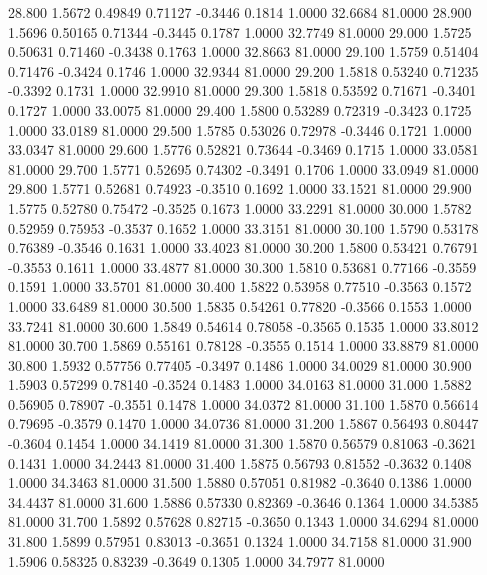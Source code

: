   28.800   1.5672   0.49849   0.71127  -0.3446   0.1814   1.0000  32.6684  81.0000
  28.900   1.5696   0.50165   0.71344  -0.3445   0.1787   1.0000  32.7749  81.0000
  29.000   1.5725   0.50631   0.71460  -0.3438   0.1763   1.0000  32.8663  81.0000
  29.100   1.5759   0.51404   0.71476  -0.3424   0.1746   1.0000  32.9344  81.0000
  29.200   1.5818   0.53240   0.71235  -0.3392   0.1731   1.0000  32.9910  81.0000
  29.300   1.5818   0.53592   0.71671  -0.3401   0.1727   1.0000  33.0075  81.0000
  29.400   1.5800   0.53289   0.72319  -0.3423   0.1725   1.0000  33.0189  81.0000
  29.500   1.5785   0.53026   0.72978  -0.3446   0.1721   1.0000  33.0347  81.0000
  29.600   1.5776   0.52821   0.73644  -0.3469   0.1715   1.0000  33.0581  81.0000
  29.700   1.5771   0.52695   0.74302  -0.3491   0.1706   1.0000  33.0949  81.0000
  29.800   1.5771   0.52681   0.74923  -0.3510   0.1692   1.0000  33.1521  81.0000
  29.900   1.5775   0.52780   0.75472  -0.3525   0.1673   1.0000  33.2291  81.0000
  30.000   1.5782   0.52959   0.75953  -0.3537   0.1652   1.0000  33.3151  81.0000
  30.100   1.5790   0.53178   0.76389  -0.3546   0.1631   1.0000  33.4023  81.0000
  30.200   1.5800   0.53421   0.76791  -0.3553   0.1611   1.0000  33.4877  81.0000
  30.300   1.5810   0.53681   0.77166  -0.3559   0.1591   1.0000  33.5701  81.0000
  30.400   1.5822   0.53958   0.77510  -0.3563   0.1572   1.0000  33.6489  81.0000
  30.500   1.5835   0.54261   0.77820  -0.3566   0.1553   1.0000  33.7241  81.0000
  30.600   1.5849   0.54614   0.78058  -0.3565   0.1535   1.0000  33.8012  81.0000
  30.700   1.5869   0.55161   0.78128  -0.3555   0.1514   1.0000  33.8879  81.0000
  30.800   1.5932   0.57756   0.77405  -0.3497   0.1486   1.0000  34.0029  81.0000
  30.900   1.5903   0.57299   0.78140  -0.3524   0.1483   1.0000  34.0163  81.0000
  31.000   1.5882   0.56905   0.78907  -0.3551   0.1478   1.0000  34.0372  81.0000
  31.100   1.5870   0.56614   0.79695  -0.3579   0.1470   1.0000  34.0736  81.0000
  31.200   1.5867   0.56493   0.80447  -0.3604   0.1454   1.0000  34.1419  81.0000
  31.300   1.5870   0.56579   0.81063  -0.3621   0.1431   1.0000  34.2443  81.0000
  31.400   1.5875   0.56793   0.81552  -0.3632   0.1408   1.0000  34.3463  81.0000
  31.500   1.5880   0.57051   0.81982  -0.3640   0.1386   1.0000  34.4437  81.0000
  31.600   1.5886   0.57330   0.82369  -0.3646   0.1364   1.0000  34.5385  81.0000
  31.700   1.5892   0.57628   0.82715  -0.3650   0.1343   1.0000  34.6294  81.0000
  31.800   1.5899   0.57951   0.83013  -0.3651   0.1324   1.0000  34.7158  81.0000
  31.900   1.5906   0.58325   0.83239  -0.3649   0.1305   1.0000  34.7977  81.0000
